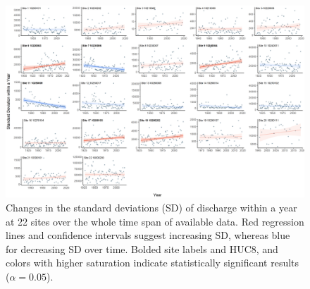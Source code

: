 \documentclass[12pt,]{article}
\makeatletter
\def\maxwidth{\ifdim\Gin@nat@width>\linewidth\linewidth\else\Gin@nat@width\fi}
\makeatother
\begin{document}
\begin{figure}[H]
\includegraphics[width=\maxwidth]{../Figures/sd_year} \caption{\label{fig:varfig} Changes in the standard deviations (SD) of discharge within a year at 22 sites over the whole time span of available data. Red regression lines and confidence intervals suggest increasing SD, whereas blue for decreasing SD over time. Bolded site labels and HUC8, and colors with higher saturation indicate statistically significant results ($\alpha = 0.05$).}\label{fig:varfig}
\end{figure}
\end{document}

